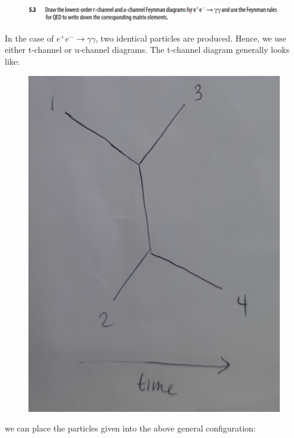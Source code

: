 \documentclass[11pt]{article}
\theoremstyle{definition}
\begin{document}
\newpage

\begin{figure}[H]
    \centering
    \includegraphics[scale = 0.55]{5.3.png}
\end{figure}

In the case of $e^{+}e^{-}\to\gamma\gamma$, two identical particles are produced. Hence, we use either t-channel or u-channel diagrams. The t-channel diagram generally looks like:

\begin{figure}[H]
    \centering
    \includegraphics[scale = 0.1]{general t-channel.jpg}
\end{figure}

we can place the particles given into the above general configuration:
\end{document}
